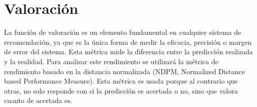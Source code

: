\section{Valoración} \label{Valoracion}
La función de valoración es un elemento fundamental en cualquier sistema de recomendación, ya que es la única forma de medir la eficacia, precisión o margen de error del sistema. Esta métrica mide la diferencia entre  la predicción realizada y la realidad. Para analizar este rendimiento se utilizará la métrica de rendimiento basado en la distancia normalizada (NDPM, Normalized Distance based Performance Measure). Esta métrica es usada porque al contrario que otras, no solo responde con si la predicción es acertada o no, sino que valora cuanto de acertada es.

